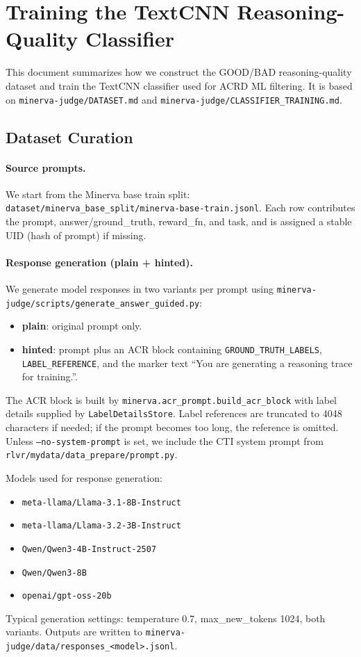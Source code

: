 \section{Training the TextCNN Reasoning-Quality Classifier}
\label{sec:textcnn-judge-training}

This document summarizes how we construct the GOOD/BAD reasoning-quality dataset
and train the TextCNN classifier used for ACRD ML filtering. It is based on
\texttt{minerva-judge/DATASET.md} and \texttt{minerva-judge/CLASSIFIER\_TRAINING.md}.

\subsection{Dataset Curation}
\label{subsec:textcnn-dataset-curation}

\paragraph{Source prompts.}
We start from the Minerva base train split:
\texttt{dataset/minerva\_base\_split/minerva-base-train.jsonl}.
Each row contributes the prompt, answer/ground\_truth, reward\_fn, and task, and
is assigned a stable UID (hash of prompt) if missing.

\paragraph{Response generation (plain + hinted).}
We generate model responses in two variants per prompt using
\texttt{minerva-judge/scripts/generate\_answer\_guided.py}:
\begin{itemize}
  \item \textbf{plain}: original prompt only.
  \item \textbf{hinted}: prompt plus an ACR block containing
        \texttt{GROUND\_TRUTH\_LABELS}, \texttt{LABEL\_REFERENCE}, and the marker
        text ``You are generating a reasoning trace for training.''.
\end{itemize}
The ACR block is built by \texttt{minerva.acr\_prompt.build\_acr\_block} with
label details supplied by \texttt{LabelDetailsStore}. Label references are
truncated to 4048 characters if needed; if the prompt becomes too long, the
reference is omitted. Unless \texttt{--no-system-prompt} is set, we include the
CTI system prompt from \texttt{rlvr/mydata/data\_prepare/prompt.py}.

Models used for response generation:
\begin{itemize}
  \item \texttt{meta-llama/Llama-3.1-8B-Instruct}
  \item \texttt{meta-llama/Llama-3.2-3B-Instruct}
  \item \texttt{Qwen/Qwen3-4B-Instruct-2507}
  \item \texttt{Qwen/Qwen3-8B}
  \item \texttt{openai/gpt-oss-20b}
\end{itemize}
Typical generation settings: temperature 0.7, max\_new\_tokens 1024, both variants.
Outputs are written to \texttt{minerva-judge/data/responses\_<model>.jsonl}.


